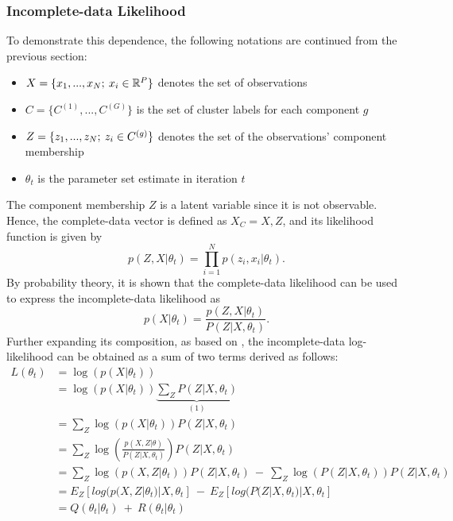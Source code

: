 \subsubsection{Incomplete-data Likelihood}
\label{sec:incompletedataLL}
To demonstrate this dependence, the following notations are continued from the previous section:
\begin{itemize}
    \item \(X=\{x_1, ..., x_N; \: x_i \in \mathbb{R}^P\}\) denotes the set of observations
    \item \(C=\{C^{(1)}, ..., C^{(G)}\}\) is the set of cluster labels for each component \(g\)
    \item \(Z=\{z_1, ..., z_N; \: z_i \in C^{(g)}\}\) denotes the set of the observations' component membership
    \item \(\theta_t\) is the parameter set estimate in iteration \(t\) 
\end{itemize}
The component membership $Z$ is a latent variable since it is not observable. Hence, the complete-data vector is defined as $X_C={X, Z}$, and its likelihood function is given by
\begin{equation}
    p(Z,X|\theta_t) = \prod_{i=1}^{N}p(z_i, x_i|\theta_t).
\end{equation}
By probability theory, it is shown that the complete-data likelihood can be used to express the incomplete-data likelihood as
\begin{equation}
    p(X|\theta_t) = \frac{p(Z,X|\theta_t)}{P(Z|X,\theta_t)}.
\end{equation}
Further expanding its composition, as based on , the incomplete-data log-likelihood can be obtained as a sum of two terms derived as follows:
\begin{equation*}
    \begin{aligned}
    L( \theta _{t}) & =\log( p( X|\theta _{t}))\\
     & =\log( p( X|\theta _{t}))\underbrace{\sum _{Z} P( Z|X,\theta _{t})}_{( 1)}\\
     & =\sum _{Z}\log( p( X|\theta _{t})) P( Z|X,\theta _{t})\\
     & =\sum _{Z}\log\left(\frac{p( X,Z|\theta )}{P( Z|X,\theta _{t})}\right) P( Z|X,\theta _{t})\\
     & =\sum _{Z}\log( p( X,Z|\theta _{t})) P( Z|X,\theta _{t}) \ -\ \sum _{Z}\log( P( Z|X,\theta _{t})) P( Z|X,\theta _{t})\\
     & =E_{Z}[ log( p( X,Z|\theta _{t}) |X,\theta _{t}] \ -\ E_{Z}[ log( P( Z|X,\theta _{t}) |X,\theta _{t}]\\
     & =Q( \theta _{t} |\theta _{t}) \ +\ R( \theta _{t} |\theta _{t})
    \end{aligned}
\end{equation*}

